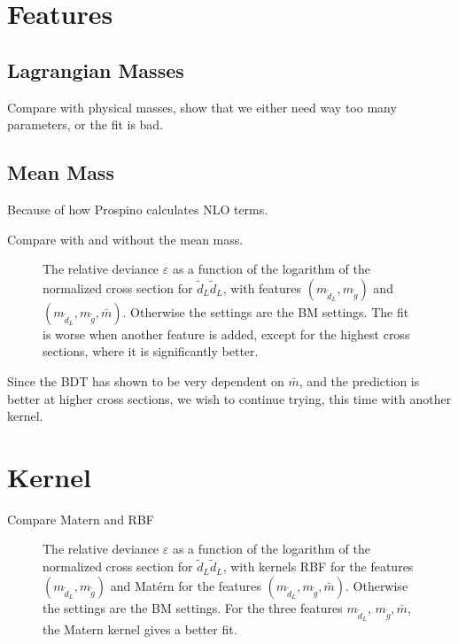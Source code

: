 \documentclass[twoside,english]{uiofysmaster}
\begin{document}
\section{Features}

\subsection{Lagrangian Masses}

Compare with physical masses, show that we either need way too many parameters, or the fit is bad.


\subsection{Mean Mass}

Because of how Prospino calculates NLO terms.

Compare with and without the mean mass.

\begin{figure}[H]
\centering
\caption{The relative deviance $\varepsilon$ as a function of the logarithm of the normalized cross section for $\tilde{d}_L \tilde{d}_L$, with features $(m_{\tilde{d}_L}, m_{\tilde{g}})$ and $(m_{\tilde{d}_L}, m_{\tilde{g}}, \bar{m})$. Otherwise the settings are the BM settings. The fit is worse when another feature is added, except for the highest cross sections, where it is significantly better.}
\end{figure}

Since the BDT has shown to be very dependent on $\bar{m}$, and the prediction is better at higher cross sections, we wish to continue trying, this time with another kernel.

\section{Kernel}

Compare Matern and RBF

\begin{figure}[H]
\centering
\caption{The relative deviance $\varepsilon$ as a function of the logarithm of the normalized cross section for $\tilde{d}_L \tilde{d}_L$, with kernels RBF for the features $(m_{\tilde{d}_L}, m_{\tilde{g}})$ and Mat\'{e}rn for the features $(m_{\tilde{d}_L}, m_{\tilde{g}}, \bar{m})$. Otherwise the settings are the BM settings. For the three features $m_{\tilde{d}_L}$, $m_{\tilde{g}}, \bar{m}$, the Matern kernel gives a better fit.}
\end{figure}
\end{document}

